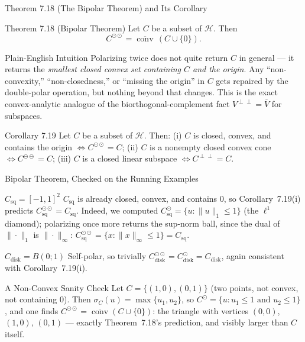 \documentclass[aspectratio=169,10pt]{beamer}
\DeclareMathOperator{\conv}{conv}
\newcommand{\Hil}{\mathcal{H}}
\newcommand{\closure}[1]{\overline{#1}}
\begin{document}
\begin{frame}{Theorem 7.18 (The Bipolar Theorem) and Its Corollary}

  \begin{block}{Theorem 7.18 (Bipolar Theorem)}
    Let $C$ be a subset of $\Hil$. Then
    \[
      C^{\odot\odot} = \closure{\conv}\,(C \cup \{0\}).
    \]
  \end{block}

  \begin{block}{Plain-English Intuition}
    Polarizing twice does not quite return $C$ in general --- it returns
    the \emph{smallest closed convex set containing $C$ and the origin}.
    Any ``non-convexity,'' ``non-closedness,'' or ``missing the origin'' in
    $C$ gets repaired by the double-polar operation, but nothing beyond
    that changes. This is the exact convex-analytic analogue of the
    biorthogonal-complement fact $V^{\perp\perp}=\closure{V}$ for subspaces.
  \end{block}

  \begin{block}{Corollary 7.19}
    Let $C$ be a subset of $\Hil$. Then: (i) $C$ is closed, convex, and
    contains the origin $\iff C^{\odot\odot}=C$; (ii) $C$ is a nonempty
    closed convex cone $\iff C^{\ominus\ominus}=C$; (iii) $C$ is a closed
    linear subspace $\iff C^{\perp\perp}=C$.
  \end{block}

\end{frame}

\begin{frame}{Bipolar Theorem, Checked on the Running Examples}

  \begin{exampleblock}{$C_{\mathrm{sq}} = [-1,1]^2$}
    $C_{\mathrm{sq}}$ is already closed, convex, and contains $0$, so
    Corollary~7.19(i) predicts $C_{\mathrm{sq}}^{\odot\odot} =
    C_{\mathrm{sq}}$. Indeed, we computed $C_{\mathrm{sq}}^\odot = \{u :
    \|u\|_1 \le 1\}$ (the $\ell^1$ diamond); polarizing once more returns
    the sup-norm ball, since the dual of $\|\cdot\|_1$ is $\|\cdot\|_\infty$:
    $C_{\mathrm{sq}}^{\odot\odot} = \{x : \|x\|_\infty \le 1\} =
    C_{\mathrm{sq}}$.
  \end{exampleblock}

  \begin{exampleblock}{$C_{\mathrm{disk}} = B(0;1)$}
    Self-polar, so trivially $C_{\mathrm{disk}}^{\odot\odot} =
    C_{\mathrm{disk}}^\odot = C_{\mathrm{disk}}$, again consistent with
    Corollary~7.19(i).
  \end{exampleblock}

  \begin{block}{A Non-Convex Sanity Check}
    Let $C = \{(1,0),(0,1)\}$ (two points, not convex, not containing $0$).
    Then $\sigma_C(u) = \max\{u_1,u_2\}$, so $C^\odot = \{u : u_1 \le 1
    \text{ and } u_2 \le 1\}$, and one finds $C^{\odot\odot} =
    \closure{\conv}(C \cup \{0\})$: the triangle with vertices $(0,0)$,
    $(1,0)$, $(0,1)$ --- exactly Theorem~7.18's prediction, and visibly
    larger than $C$ itself.
  \end{block}

\end{frame}
\end{document}
